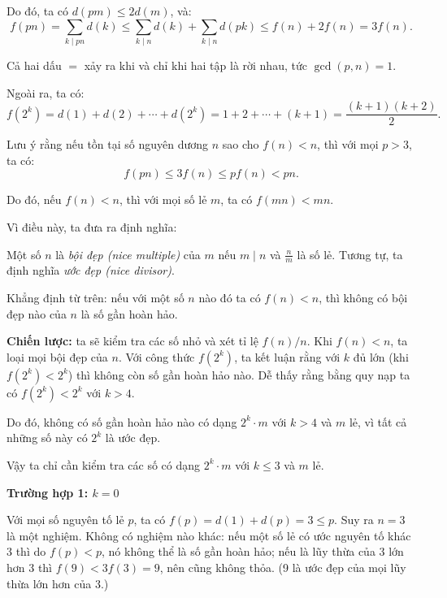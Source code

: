 \begin{problem}
\begin{soln}
\begin{subproof}
        Do đó, ta có \( d(pm) \le 2d(m) \), và:
        \[
            f(pn) = \sum_{k \mid pn} d(k) \le \sum_{k \mid n} d(k) + \sum_{k \mid n} d(pk) \le f(n) + 2f(n) = 3f(n).
        \]

        Cả hai dấu $=$ xảy ra khi và chỉ khi hai tập là rời nhau, tức \( \gcd(p, n) = 1 \).
    \end{subproof}

    Ngoài ra, ta có:
    \[
        f(2^k) = d(1) + d(2) + \cdots + d(2^k) = 1 + 2 + \cdots + (k+1) = \frac{(k+1)(k+2)}{2}.
    \]

    Lưu ý rằng nếu tồn tại số nguyên dương \( n \) sao cho \( f(n) < n \), thì với mọi \( p > 3 \), ta có:
    \[
        f(pn) \le 3f(n) \le pf(n) < pn.
    \]

    Do đó, nếu \( f(n) < n \), thì với mọi số lẻ \( m \), ta có \( f(mn) < mn \).

    Vì điều này, ta đưa ra định nghĩa:
    \begin{definition*}
        Một số \( n \) là \textit{bội đẹp (nice multiple)} của \( m \) nếu \( m \mid n \) và \( \frac{n}{m} \) là số lẻ. 
        Tương tự, ta định nghĩa \textit{ước đẹp (nice divisor)}.
    \end{definition*}

    Khẳng định từ trên: nếu với một số \( n \) nào đó ta có \( f(n) < n \), thì không có bội đẹp nào của \( n \) là số gần hoàn hảo.

    \textbf{Chiến lược:} ta sẽ kiểm tra các số nhỏ và xét tỉ lệ \( f(n) / n \). Khi \( f(n) < n \), ta loại mọi bội đẹp của \( n \). 
    Với công thức \( f(2^k) \), ta kết luận rằng với \( k \) đủ lớn (khi \( f(2^k) < 2^k \)) thì không còn số gần hoàn hảo nào. 
    Dễ thấy rằng bằng quy nạp ta có \( f(2^k) < 2^k \) với \( k > 4 \).

    Do đó, không có số gần hoàn hảo nào có dạng \( 2^k \cdot m \) với \( k > 4 \) và \( m \) lẻ, vì tất cả những số này có \( 2^k \) là ước đẹp.

    Vậy ta chỉ cần kiểm tra các số có dạng \( 2^k \cdot m \) với \( k \le 3 \) và \( m \) lẻ.

    \textbf{Trường hợp 1: \( k = 0 \)}

    Với mọi số nguyên tố lẻ \( p \), ta có \( f(p) = d(1) + d(p) = 3 \le p \). Suy ra \( n = 3 \) là một nghiệm. 
    Không có nghiệm nào khác: nếu một số lẻ có ước nguyên tố khác 3 thì do \( f(p) < p \), nó không thể là số gần hoàn hảo; 
    nếu là lũy thừa của 3 lớn hơn 3 thì \( f(9) < 3f(3) = 9 \), nên cũng không thỏa. (9 là ước đẹp của mọi lũy thừa lớn hơn của 3.)


\end{soln}
\end{problem}
